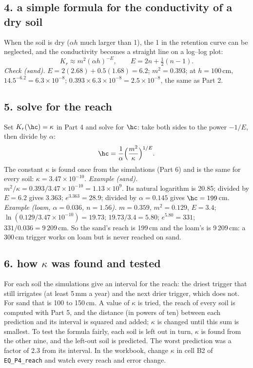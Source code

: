 \subsection{4. a simple formula for the conductivity of a dry soil}
When the soil is dry ($\alpha h$ much larger than 1), the 1 in the retention curve can be neglected, and the conductivity becomes a straight line on a log--log plot:
\[K_r\approx m^2(\alpha h)^{-E},\qquad E=2n+\tfrac12(n-1).\]
\emph{Check (sand).} $E=2(2.68)+0.5(1.68)=6.2$; $m^2=0.393$; at $h=100$\,cm, $14.5^{-6.2}=6.3\times10^{-8}$; $0.393\times6.3\times10^{-8}=2.5\times10^{-8}$, the same as Part 2.

\subsection{5. solve for the reach}
Set $K_r(\hc)=\kappa$ in Part 4 and solve for $\hc$: take both sides to the power $-1/E$, then divide by $\alpha$:
\[\hc=\frac1\alpha\Bigl(\frac{m^2}{\kappa}\Bigr)^{1/E}.\]
The constant $\kappa$ is found once from the simulations (Part 6) and is the same for every soil: $\kappa=3.47\times10^{-10}$.
\emph{Example (sand).} $m^2/\kappa=0.393/3.47\times10^{-10}=1.13\times10^{9}$. Its natural logarithm is 20.85; divided by $E=6.2$ gives 3.363; $e^{3.363}=28.9$; divided by $\alpha=0.145$ gives $\hc=199$\,cm.
\emph{Example (loam, $\alpha=0.036$, $n=1.56$).} $m=0.359$, $m^2=0.129$, $E=3.4$; $\ln(0.129/3.47\times10^{-10})=19.73$; $19.73/3.4=5.80$; $e^{5.80}=331$; $331/0.036=9\,209$\,cm.
So the sand's reach is 199\,cm and the loam's is 9\,209\,cm: a 300\,cm trigger works on loam but is never reached on sand.

\subsection{6. how $\kappa$ was found and tested}
For each soil the simulations give an interval for the reach: the driest trigger that still irrigates (at least 5\,mm a year) and the next drier trigger, which does not. For sand that is 100 to 150\,cm. A value of $\kappa$ is tried, the reach of every soil is computed with Part 5, and the distance (in powers of ten) between each prediction and its interval is squared and added; $\kappa$ is changed until this sum is smallest. To test the formula fairly, each soil is left out in turn, $\kappa$ is found from the other nine, and the left-out soil is predicted. The worst prediction was a factor of 2.3 from its interval. In the workbook, change $\kappa$ in cell B2 of \texttt{EQ\_P4\_reach} and watch every reach and error change.

